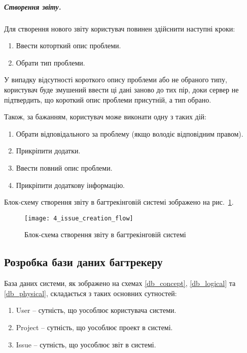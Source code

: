 \documentclass[../main.tex]{subfiles}
\begin{document}
		\subparagraph{Створення звіту.}
			Для створення нового звіту користувач повинен здійснити наступні кроки:
			\begin{enumerate}
				\item Ввести которткий опис проблеми.
				\item Обрати тип проблеми.
			\end{enumerate}
			
			У випадку відсутності короткого опису проблеми або не обраного типу, користувач буде змушений ввести ці дані заново до тих пір, доки сервер не підтвердить, що короткий опис проблеми присутній, а тип обрано.
			
			Також, за бажанням, користувач може виконати одну з таких дій:
			\begin{enumerate}
				\item Обрати відповідального за проблему (якщо володіє відповідним правом).
				\item Прикріпити додатки.
				\item Ввести повний опис проблеми.
				\item Прикріпити додаткову інформацію.
			\end{enumerate}
			
			Блок-схему створення звіту в багтрекінговій системі зображено на рис.~\ref{flowchart_issue_creation}.
			
			\begin{figure}[H]
				\centering
				\texttt{[image: 4\_issue\_creation\_flow]}
				\caption{Блок-схема створення звіту в багтрекінговій системі}
				\label{flowchart_issue_creation}
			\end{figure}

	\subsection{Розробка бази даних багтрекеру}
		База даних системи, як зображено на схемах \ref{db_concept}, \ref{db_logical} та \ref{db_physical}, складається з таких основних сутностей:
		\begin{enumerate}
			\item User -- сутність, що уособлює користувача системи.
			\item Project -- сутність, що уособлює проект в системі.
			\item Issue -- сутність, що уособлює звіт в системі.
		\end{enumerate}
		
\end{document}
